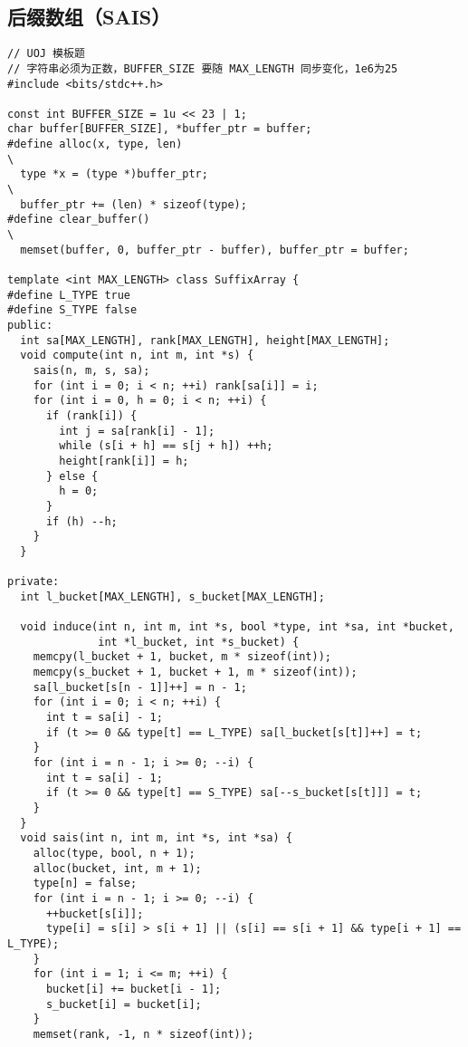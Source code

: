 \documentclass[twoside]{article}
\begin{document}
\subsection{后缀数组（SAIS）}
\begin{lstlisting}
// UOJ 模板题
// 字符串必须为正数，BUFFER_SIZE 要随 MAX_LENGTH 同步变化，1e6为25
#include <bits/stdc++.h>

const int BUFFER_SIZE = 1u << 23 | 1;
char buffer[BUFFER_SIZE], *buffer_ptr = buffer;
#define alloc(x, type, len)                                                    \
  type *x = (type *)buffer_ptr;                                                \
  buffer_ptr += (len) * sizeof(type);
#define clear_buffer()                                                         \
  memset(buffer, 0, buffer_ptr - buffer), buffer_ptr = buffer;

template <int MAX_LENGTH> class SuffixArray {
#define L_TYPE true
#define S_TYPE false
public:
  int sa[MAX_LENGTH], rank[MAX_LENGTH], height[MAX_LENGTH];
  void compute(int n, int m, int *s) {
    sais(n, m, s, sa);
    for (int i = 0; i < n; ++i) rank[sa[i]] = i;
    for (int i = 0, h = 0; i < n; ++i) {
      if (rank[i]) {
        int j = sa[rank[i] - 1];
        while (s[i + h] == s[j + h]) ++h;
        height[rank[i]] = h;
      } else {
        h = 0;
      }
      if (h) --h;
    }
  }

private:
  int l_bucket[MAX_LENGTH], s_bucket[MAX_LENGTH];

  void induce(int n, int m, int *s, bool *type, int *sa, int *bucket,
              int *l_bucket, int *s_bucket) {
    memcpy(l_bucket + 1, bucket, m * sizeof(int));
    memcpy(s_bucket + 1, bucket + 1, m * sizeof(int));
    sa[l_bucket[s[n - 1]]++] = n - 1;
    for (int i = 0; i < n; ++i) {
      int t = sa[i] - 1;
      if (t >= 0 && type[t] == L_TYPE) sa[l_bucket[s[t]]++] = t;
    }
    for (int i = n - 1; i >= 0; --i) {
      int t = sa[i] - 1;
      if (t >= 0 && type[t] == S_TYPE) sa[--s_bucket[s[t]]] = t;
    }
  }
  void sais(int n, int m, int *s, int *sa) {
    alloc(type, bool, n + 1);
    alloc(bucket, int, m + 1);
    type[n] = false;
    for (int i = n - 1; i >= 0; --i) {
      ++bucket[s[i]];
      type[i] = s[i] > s[i + 1] || (s[i] == s[i + 1] && type[i + 1] == L_TYPE);
    }
    for (int i = 1; i <= m; ++i) {
      bucket[i] += bucket[i - 1];
      s_bucket[i] = bucket[i];
    }
    memset(rank, -1, n * sizeof(int));


\end{lstlisting}
\end{document}
